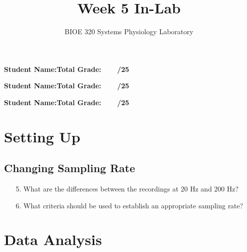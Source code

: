 \documentclass{article}
\title{Week 5 In-Lab}
\author{BIOE 320 Systems Physiology Laboratory}
\date{}
\begin{document}
\large
\maketitle

\textbf{Student Name:}\hfill 	\textbf{Total Grade:\ \ \ \ /25}\vspace{0.5cm}

\textbf{Student Name:}\hfill 	\textbf{Total Grade:\ \ \ \ /25}\vspace{0.5cm}

\textbf{Student Name:}\hfill 	\textbf{Total Grade:\ \ \ \ /25}\\

\section*{Setting Up}
\subsection*{Changing Sampling Rate}
\begin{itemize}
	\item[5.] What are the differences between the recordings at 20 Hz and 200 Hz?\vspace{3cm}
	\item[6.] What criteria should be used to establish an appropriate sampling rate?\vspace{3cm}
\end{itemize}

\section*{Data Analysis}
\end{document}
